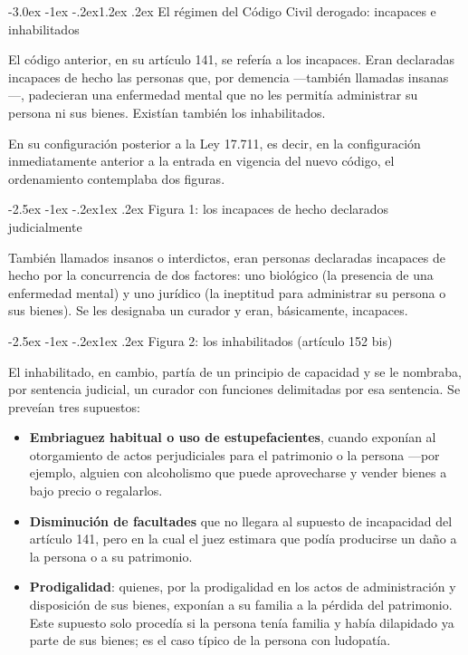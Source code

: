 \documentclass[12pt,oneside]{book}
\makeatletter
\renewcommand\section{\@startsection{section}{1}{\z@}%
  {-3.0ex \@plus -1ex \@minus -.2ex}{1.2ex \@plus .2ex}%
  {\normalfont\large\bfseries\color{acento}}}
\renewcommand\subsection{\@startsection{subsection}{2}{\z@}%
  {-2.5ex \@plus -1ex \@minus -.2ex}{1ex \@plus .2ex}%
  {\normalfont\normalsize\bfseries}}
\makeatother
\begin{document}
\section{El régimen del Código Civil derogado: incapaces e inhabilitados}

El código anterior, en su artículo 141, se refería a los incapaces. Eran declaradas incapaces de hecho las personas que, por demencia ---también llamadas insanas---, padecieran una enfermedad mental que no les permitía administrar su persona ni sus bienes. Existían también los inhabilitados.

En su configuración posterior a la Ley 17.711, es decir, en la configuración inmediatamente anterior a la entrada en vigencia del nuevo código, el ordenamiento contemplaba dos figuras.

\subsection{Figura 1: los incapaces de hecho declarados judicialmente}

También llamados insanos o interdictos, eran personas declaradas incapaces de hecho por la concurrencia de dos factores: uno biológico (la presencia de una enfermedad mental) y uno jurídico (la ineptitud para administrar su persona o sus bienes). Se les designaba un curador y eran, básicamente, incapaces.

\subsection{Figura 2: los inhabilitados (artículo 152 bis)}

El inhabilitado, en cambio, partía de un principio de capacidad y se le nombraba, por sentencia judicial, un curador con funciones delimitadas por esa sentencia. Se preveían tres supuestos:

\begin{itemize}
\item \textbf{Embriaguez habitual o uso de estupefacientes}, cuando exponían al otorgamiento de actos perjudiciales para el patrimonio o la persona ---por ejemplo, alguien con alcoholismo que puede aprovecharse y vender bienes a bajo precio o regalarlos.
\item \textbf{Disminución de facultades} que no llegara al supuesto de incapacidad del artículo 141, pero en la cual el juez estimara que podía producirse un daño a la persona o a su patrimonio.
\item \textbf{Prodigalidad}: quienes, por la prodigalidad en los actos de administración y disposición de sus bienes, exponían a su familia a la pérdida del patrimonio. Este supuesto solo procedía si la persona tenía familia y había dilapidado ya parte de sus bienes; es el caso típico de la persona con ludopatía.
\end{itemize}
\end{document}
